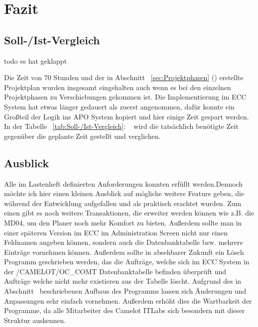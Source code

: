 \section{Fazit} 
\label{sec:Fazit}

\subsection{Soll-/Ist-Vergleich}
\label{sec:SollIstVergleich}

todo es hat geklappt

Die Zeit von 70 Stunden und der in Abschnitt ~\ref{sec:Projektphasen} () erstellte Projektplan wurden insgesamt eingehalten auch wenn es bei den einzelnen Projektphasen zu Verschiebungen gekommen ist. Die Implementierung im \ac{ECC} System hat etwas länger gedauert als zuerst angenommen, dafür konnte ein Großteil der Logik ins \ac{APO} System kopiert und hier einige Zeit gespart werden. In der Tabelle ~\ref{tab:Soll-/Ist-Vergleich}: ~ wird die tatsächlich benötigte Zeit gegenüber die geplante Zeit gestellt und verglichen.

\subsection{Ausblick}
\label{sec:Ausblick}
Alle im Lastenheft definierten Anforderungen konnten erfüllt werden.Dennoch möchte ich hier einen kleinen Ausblick auf mögliche weitere Feature geben, die während der Entwicklung aufgefallen und als praktisch erachtet wurden. Zum einen gibt es noch weitere Transaktionen, die erweiter werden können wie z.B. die MD04, um den Planer noch mehr Komfort zu bieten. Außerdem sollte man in einer späteren Version im \ac{ECC} im Administration Screen nicht nur einen Feldnamen angeben können, sondern auch die Datenbanktabelle bzw. mehrere Einträge vornehmen können. Außerdem sollte in absehbarer Zukunft ein Lösch Programm geschrieben werden, das die Aufträge, welche sich im ECC System in der /CAMELOT/OC\_COMT Datenbanktabelle befinden überprüft und Aufträge welche nicht mehr existieren aus der Tabelle löscht. Aufgrund des in Abschnitt~ beschriebenen Aufbaus des Programms lassen sich Änderungen und Anpassungen sehr einfach vornehmen. Außerdem erhöht dies die Wartbarkeit der Programme, da alle Mitarbeiter des Camelot ITLabs sich besondern mit dieser Struktur auskennen. 
